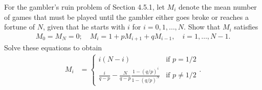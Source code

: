 \begin{problem}{4.59}
  For the gambler's ruin problem of Section 4.5.1, let $M_i$ denote the mean number
  of games that must be played until the gambler either goes broke or reaches a
  fortune of $N$, given that he starts with $i$ for $i=0,1,\dots, N$. Show that
  $M_i$ satisfies
  \begin{align*}
    M_0 = M_N = 0; \quad M_i = 1 + p M_{i+1} + q M_{i-1}, \quad i=1,\dots, N - 1.
  \end{align*}
  Solve these equations to obtain
  \begin{align*}
    M_i &=
    \begin{cases}
      i(N-i) & \text{if $p = 1/2$} \\
      \displaystyle \frac{i}{q-p} - \frac{N}{q-p}\frac{1-(q/p)^i}{1- (q/p)^N} & \text{if $p \neq 1/2$}
    \end{cases}.
  \end{align*}
\end{problem}

